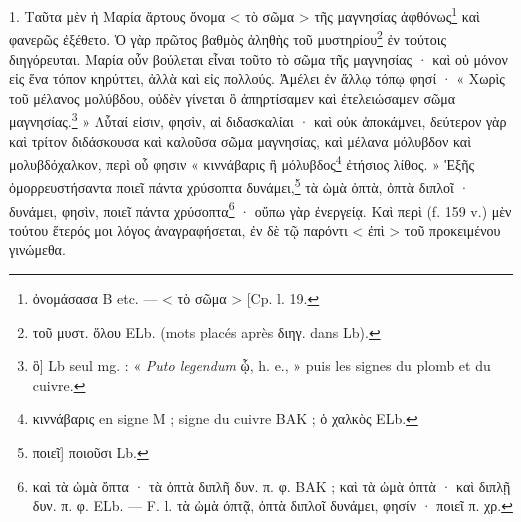 \documentclass[a4paper, 11pt, oneside, polutonikogreek, french]{article}
\begin{document}
\bigskip

1. Ταῦτα μὲν ἡ Μαρία ἄρτους ὄνομα < τὸ σῶμα > τῆς μαγνησίας ἀφθόνως\footnote{ὀνομάσασα B etc. --- < τὸ σῶμα > [Cp. l. 19.} καὶ φανερῶς ἐξέθετο. Ὁ γὰρ πρῶτος βαθμὸς ἀληθὴς τοῦ μυστηρίου\footnote{τοῦ μυστ. ὅλου ELb. (mots placés après διηγ. dans Lb).} ἐν τούτοις διηγόρευται. Μαρία οὖν βούλεται εἶναι τοῦτο τὸ σῶμα τῆς μαγνησίας · καὶ οὐ μόνον εἰς ἕνα τόπον κηρύττει, ἀλλὰ καὶ εἰς πολλούς. Ἀμέλει ἐν ἄλλῳ τόπῳ φησί · « Χωρὶς τοῦ μέλανος μολύβδου, οὐδὲν γίνεται ὃ ἀπηρτίσαμεν καὶ ἐτελειώσαμεν σῶμα μαγνησίας.\footnote{ὃ] Lb seul mg. : « \emph{Puto legendum} ᾧ, h. e., » puis les signes du plomb et du cuivre.} » Λὗταί εἰσιν, φησὶν, αἱ διδασκαλίαι · καὶ οὐκ ἀποκάμνει, δεύτερον γὰρ καὶ τρίτον διδάσκουσα καὶ καλοῦσα σῶμα μαγνησίας, καὶ μέλανα μόλυβδον καὶ μολυβδόχαλκον, περὶ οὗ φησιν « κιννάβαρις ἢ μόλυβδος\footnote{κιννάβαρις en signe M ; signe du cuivre BAK ; ὁ χαλκὸς ELb.} ἐτήσιος λίθος. » Ἑξῆς ὀμορρευστήσαντα ποιεῖ πάντα χρύσοπτα δυνάμει,\footnote{ποιεῖ] ποιοῦσι Lb.} τὰ ὠμὰ ὀπτὰ, ὀπτὰ διπλοῖ · δυνάμει, φησὶν, ποιεῖ πάντα χρύσοπτα\footnote{καὶ τὰ ὠμὰ ὄπτα · τὰ ὀπτὰ διπλῆ δυν. π. φ. BAK ; καὶ τὰ ὠμὰ ὀπτὰ · καὶ διπλῇ δυν. π. φ. ELb. --- F. l. τὰ ὠμὰ όπτᾷ, ὀπτὰ διπλοῖ δυνάμει, φησίν · ποιεῖ π. χρ.} · οὔπω γὰρ ἐνεργείᾳ. Καὶ περὶ (f. 159 v.) μὲν τούτου ἕτερός μοι λόγος ἀναγραφήσεται, ἐν δὲ τῷ παρόντι < ἐπὶ > τοῦ προκειμένου γινώμεθα.
\end{document}
